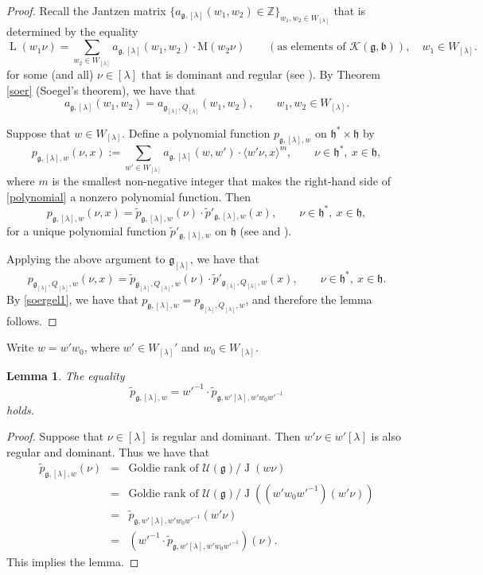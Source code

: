 \documentclass[12pt,a4paper]{amsart}
\newcommand{\CK}{{\mathcal {K}}}
\newcommand{\CU}{{\mathcal {U}}}
\newcommand{\oL}{\operatorname{L}}
\newcommand{\oJ}{\operatorname{J}}
\newcommand{\g}{\mathfrak g}
\newcommand{\h}{\mathfrak h}
\renewcommand{\b}{\mathfrak b}
\newcommand{\Z}{\mathbb{Z}}
\newcommand{\la}{\langle}
\newcommand{\ra}{\rangle}
\newcommand{\be}{\begin {equation}}
\newcommand{\ee}{\end {equation}}
\numberwithin{equation}{section}
\newtheorem{lem}[thm]{Lemma}
\theoremstyle{remark}
\newcommand{\Lam}{{[\lambda]}}
\begin{document}
\begin{proof}
Recall the Jantzen matrix $\{a_{\g,\Lam}(w_1, w_2)\in \Z \}_{w_1, w_2\in W_\Lam}$ that is determined by the equality
\[
  \oL(w_1\nu)=\sum_{w_2\in W_\Lam}  a_{\g,\Lam}(w_1, w_2) \cdot  \mathrm M(w_2 \nu)   \qquad (\textrm{as elements of $\CK(\g,\b)$}), \quad w_1\in W_\Lam.
\]
for some (and all) $\nu\in \Lam$ that is dominant and regular (see \cite[Section 2.15]{Jan}).  By Theorem \ref{soer} (Soegel's theorem), we have that
\be\label{soergel1}
  a_{\g,\Lam}(w_1, w_2)=a_{\g_\Lam,Q_\Lam}(w_1, w_2), \qquad w_1, w_2\in W_\Lam.
\ee

Suppose that $w\in W_\Lam$. Define a polynomial function $p_{\g, \Lam, w}$ on $\h^*\times \h$ by
\be\label{polynomial}
  p_{\g, \Lam, w}(\nu, x):= \sum_{w'\in W_\Lam} a_{\g,\Lam}(w, w')\cdot \la w' \nu, x\ra^m,\qquad \nu\in \h^*, \ x\in \h,
\ee
where $m$ is the smallest non-negative integer that makes the right-hand side of \eqref{polynomial} a nonzero polynomial function.
Then
\begin{equation}\label{eq:goldie.j}
    p_{\g, \Lam, w}(\nu, x)= \tilde p_{\g,\Lam,w}(\nu)\cdot \tilde p'_{\g,\Lam,w}(x), \qquad \nu\in \h^*, \ x\in \h,
\end{equation}
for a unique polynomial function $\tilde p'_{\g,\Lam,w}$ on $\h$ (see \cite{King} and \cite[Section 5.1]{J.hw}).

Applying the above argument to $\g_\Lam$, we have that
\[
    p_{\g_\Lam, Q_\Lam, w}(\nu, x)= \tilde p_{\g_\Lam,Q_\Lam,w}(\nu)\cdot \tilde p'_{\g_\Lam,Q_\Lam,w}(x), \qquad \nu\in \h^*, \ x\in \h.
\]
By \eqref{soergel1}, we have that $ p_{\g, \Lam, w}= p_{\g_\Lam, Q_\Lam, w}$, and therefore the lemma follows.
\end{proof}



Write $w=w'w_0$, where $w'\in W_\Lam'$ and $w_0\in W_\Lam$.


\begin{lem} \label{grp2}
The  equality
\[
\tilde p_{\g,\Lam,w}={w'}^{-1}\cdot \tilde p_{\g, w'\Lam,w'w_0{w'}^{-1}}
\]
holds.

\end{lem}
\begin{proof}
Suppose that $\nu\in \Lam$ is regular and dominant. Then $w'\nu\in w'\Lam$ is also regular and dominant. Thus we have that
\begin{eqnarray*}
   \tilde p_{\g,\Lam,w}(\nu)&=&\textrm{Goldie rank of } \CU(\g)/\oJ(w\nu)\\
   &=&\textrm{Goldie rank of } \CU(\g)/\oJ((w'w_0w'^{-1})(w'\nu))\\
   &=&  \tilde p_{\g,w'\Lam,w'w_0w'^{-1}}(w'\nu)\\
    &=& ( w'^{-1}\cdot \tilde p_{\g,w'\Lam,w'w_0 w'^{-1}})(\nu).
\end{eqnarray*}
This implies the lemma.
\end{proof}
\end{document}
